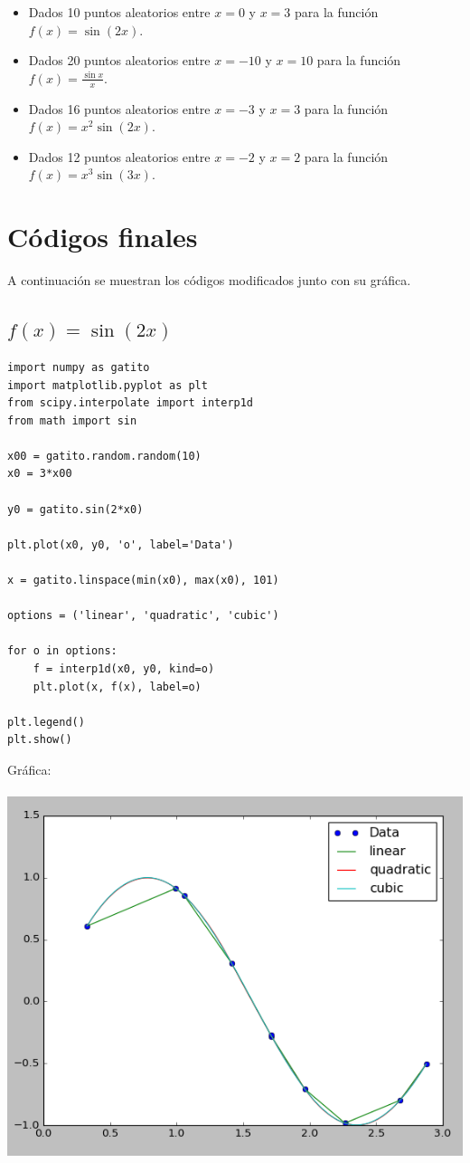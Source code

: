 \documentclass[12pt,letterpaper]{article}
\begin{document}
\begin{itemize}
\item Dados 10 puntos aleatorios entre $x = 0$ y $x = 3$ para la función $f(x) = \sin(2x)$.
\item Dados 20 puntos aleatorios entre $x = -10$ y $x = 10$ para la función $f(x) = \frac{\sin{x}}{x}$.
\item Dados 16 puntos aleatorios entre $x = -3$ y $x = 3$ para la función $f(x) = x^2 \sin(2x)$.
\item Dados 12 puntos aleatorios entre $x = -2$ y $x = 2$ para la función $f(x) = x^3 \sin(3x)$.
\end{itemize}

\newpage

\section{Códigos finales}
A continuación se muestran los códigos modificados junto con su gráfica. 

\subsection{$f(x) = \sin(2x)$}

\begin{verbatim}
import numpy as gatito
import matplotlib.pyplot as plt
from scipy.interpolate import interp1d
from math import sin

x00 = gatito.random.random(10)
x0 = 3*x00

y0 = gatito.sin(2*x0)

plt.plot(x0, y0, 'o', label='Data')

x = gatito.linspace(min(x0), max(x0), 101)

options = ('linear', 'quadratic', 'cubic')

for o in options:
    f = interp1d(x0, y0, kind=o)
    plt.plot(x, f(x), label=o)

plt.legend()
plt.show()
\end{verbatim}
Gráfica:\\
\\
\includegraphics[scale=.5]{grafica1act3.png}
\end{document}
